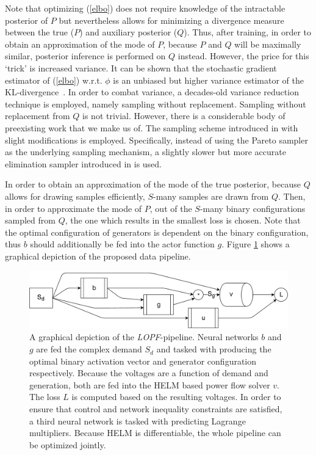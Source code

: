 Note that optimizing (\ref{elbo}) does not require knowledge of the intractable posterior of $P$ but nevertheless allows for minimizing a divergence measure between the true ($P$) and auxiliary posterior ($Q$). Thus, after training, in order to obtain an approximation of the mode of $P$, because $P$ and $Q$ will be maximally similar, posterior inference is performed on $Q$ instead.
However, the price for this `trick' is increased variance. It can be shown that the stochastic gradient estimator of (\ref{elbo}) w.r.t. $\phi$ is an unbiased but higher variance estimator of the KL-divergence~\cite{mnih2014neural}. In order to combat variance, a decades-old variance reduction technique is employed, namely sampling without replacement. Sampling without replacement from $Q$ is not trivial. However, there is a considerable body of preexisting work that we make us of. The sampling scheme introduced in \cite{shah2018without} with slight modifications is employed. Specifically, instead of using the Pareto sampler as the underlying sampling mechanism, a slightly slower but more accurate elimination sampler introduced in \cite{deville1998unequal} is used.

In order to obtain an approximation of the mode of the true posterior, because $Q$ allows for drawing samples efficiently, $S$-many samples are drawn from $Q$. Then, in order to approximate the mode of $P$, out of the $S$-many binary configurations sampled from $Q$, the one which results in the smallest loss is chosen. Note that the optimal configuration of generators is dependent on the binary configuration, thus $b$ should additionally be fed into the actor function $g$. Figure \ref{fig:pipe} shows a graphical depiction of the proposed data pipeline.
\begin{figure}
\includegraphics[width=0.95\linewidth]{krtofl/pipeline.pdf}
\caption[LOPF: Graphical depiction of the algorithmic pipeline]{A graphical depiction of the \emph{LOPF}-pipeline. Neural networks $b$ and $g$ are fed the complex demand $S_d$ and tasked with producing the optimal binary activation vector and generator configuration respectively. Because the voltages are a function of demand and generation, both are fed into the HELM based power flow solver $v$. The loss $L$ is computed based on the resulting voltages. In order to ensure that control and network inequality constraints are satisfied, a third neural network is tasked with predicting Lagrange multipliers. Because HELM is differentiable, the whole pipeline can be optimized jointly.}
\label{fig:pipe}
\end{figure}

